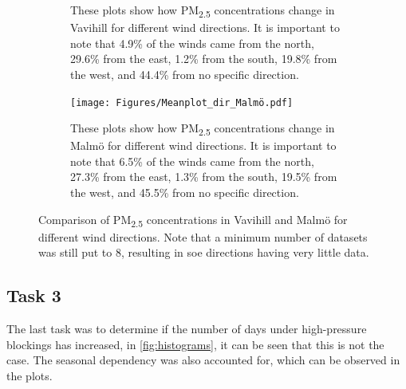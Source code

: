 \begin{figure}[H]
\begin{subfigure}[b]{0.49\textwidth}
        \caption{These plots show how PM\textsubscript{2.5} concentrations change in Vavihill for different wind directions. It is important to note that 4.9\% of the winds came from the north, 29.6\% from the east, 1.2\% from the south, 19.8\% from the west, and 44.4\% from no specific direction.}
        \label{fig:Meanplot_dir_Vavihill}
    \end{subfigure}
    \hfill
    \begin{subfigure}[b]{0.49\textwidth}
        \centering
        \texttt{[image: Figures/Meanplot\_dir\_Malmö.pdf]}
        \caption{These plots show how PM\textsubscript{2.5} concentrations change in Malmö for different wind directions. It is important to note that 6.5\% of the winds came from the north, 27.3\% from the east, 1.3\% from the south, 19.5\% from the west, and 45.5\% from no specific direction.}
        \label{fig:Meanplot_dir_Malmö}
    \end{subfigure}
    \caption{Comparison of PM\textsubscript{2.5} concentrations in Vavihill and Malmö for different wind directions. Note that a minimum number of datasets was still put to 8, resulting in soe directions having very little data. }
    \label{fig:PM25_wind_direction}
\end{figure}


\subsection{Task 3}
The last task was to determine if the number of days under high-pressure blockings has increased, in \autoref{fig:histograms}, it can be seen that this is not the case. The seasonal dependency was also accounted for, which can be observed in the plots.


